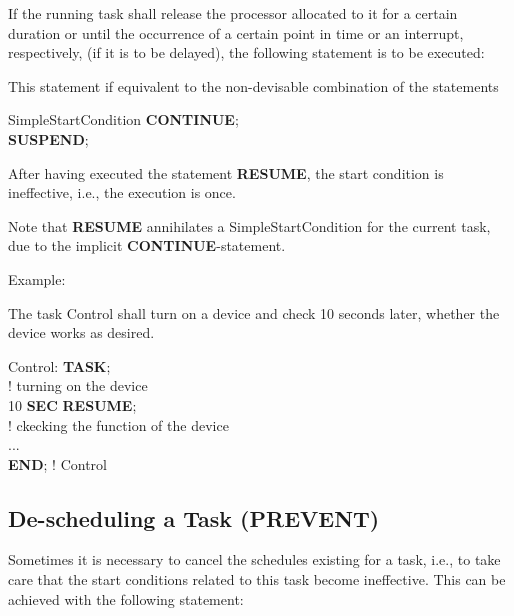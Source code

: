 If the running task shall release the processor allocated to it for a
certain duration or until the occurrence of a certain point in time or an
interrupt, respectively, (if it is to be delayed), the following
statement is to be executed:



This statement if equivalent to the non-devisable combination of
the statements

SimpleStartCondition {\bf CONTINUE};\\
{\bf SUSPEND};

After having executed the statement 
{\bf RESUME}, the start condition is
ineffective, i.e., the execution is once.

Note that {\bf RESUME} annihilates a SimpleStartCondition
for the current task, due to the implicit {\bf CONTINUE}-statement.

Example:

The task Control shall turn on a device and check 10 seconds later,
whether the device works as desired.

\begin{tabbing}
Control: \= {\bf TASK};\\
  \> \x \x ! turning on the device\\
  \>  10 {\bf SEC} {\bf RESUME};\\
  \> \x \x ! ckecking the function of the device\\
  \> \x ...\\
  \> {\bf END}; ! Control
\end{tabbing}

\subsection{De-scheduling a Task (PREVENT)}    %
\label{sec_prevent}

Sometimes it is necessary to cancel the schedules existing for a task,
i.e., to take care that the start conditions related to this task become
ineffective. This can be achieved with the following statement:



